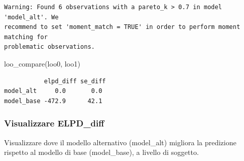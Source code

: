 \documentclass[
  11pt,
  a4paper,
  onecolumn]{article}
\newenvironment{Shaded}{}{}
\newcommand{\CommentTok}[1]{\textcolor[rgb]{0.42,0.45,0.49}{#1}}
\newcommand{\FunctionTok}[1]{\textcolor[rgb]{0.44,0.26,0.76}{#1}}
\newcommand{\NormalTok}[1]{\textcolor[rgb]{0.14,0.16,0.18}{#1}}
\newcommand{\OtherTok}[1]{\textcolor[rgb]{0.44,0.26,0.76}{#1}}
\newcommand{\SpecialCharTok}[1]{\textcolor[rgb]{0.00,0.36,0.77}{#1}}
\newcommand{\StringTok}[1]{\textcolor[rgb]{0.01,0.18,0.38}{#1}}
\begin{document}
\begin{verbatim}
Warning: Found 6 observations with a pareto_k > 0.7 in model 'model_alt'. We
recommend to set 'moment_match = TRUE' in order to perform moment matching for
problematic observations.
\end{verbatim}

\begin{Shaded}
\begin{Highlighting}[]
\FunctionTok{loo\_compare}\NormalTok{(loo0, loo1)}
\end{Highlighting}
\end{Shaded}

\begin{verbatim}
           elpd_diff se_diff
model_alt     0.0       0.0 
model_base -472.9      42.1 
\end{verbatim}

\subsubsection{Visualizzare ELPD\_diff}\label{visualizzare-elpd_diff}

Visualizzare dove il modello alternativo (model\_alt) migliora la
predizione rispetto al modello di base (model\_base), a livello di
soggetto.

\begin{Shaded}
\end{Shaded}

\begin{Shaded}
\end{Shaded}
\end{document}
